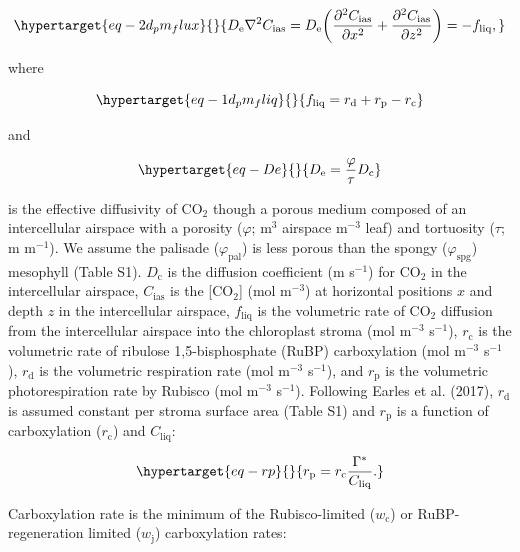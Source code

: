 \documentclass[
  letterpaper,
  DIV=11,
  numbers=noendperiod]{scrartcl}
\begin{document}
\begin{equation}\protect\hypertarget{eq-2d_pm_flux}{}{D_\text{e} \nabla^2 C_\text{ias} = D_\text{e} \bigg(\frac{\partial^2 C_\text{ias}}{\partial x^2} + \frac{\partial^2 C_\text{ias}}{\partial z^2}\bigg) = -f_\text{liq},}\label{eq-2d_pm_flux}\end{equation}

where

\begin{equation}\protect\hypertarget{eq-1d_pm_fliq}{}{f_\text{liq} = r_\text{d} + r_\text{p} - r_\text{c}}\label{eq-1d_pm_fliq}\end{equation}

and

\begin{equation}\protect\hypertarget{eq-De}{}{
D_\text{e} = \frac{\varphi}{\tau} D_\text{c}
}\label{eq-De}\end{equation}

is the effective diffusivity of CO\(_2\) though a porous medium composed
of an intercellular airspace with a porosity (\(\varphi\); m\(^3\)
airspace m\(^{-3}\) leaf) and tortuosity (\(\tau\); m m\(^{-1}\)). We
assume the palisade (\(\varphi_\text{pal}\)) is less porous than the
spongy (\(\varphi_\text{spg}\)) mesophyll (Table S1). \(D_\text{c}\) is
the diffusion coefficient (m s\(^{-1}\)) for CO\(_2\) in the
intercellular airspace, \(C_\text{ias}\) is the {[}CO\(_2\){]} (mol
m\(^{-3}\)) at horizontal positions \(x\) and depth \(z\) in the
intercellular airspace, \(f_\text{liq}\) is the volumetric rate of
CO\(_2\) diffusion from the intercellular airspace into the chloroplast
stroma (mol m\(^{-3}\) s\(^{-1}\)), \(r_\text{c}\) is the volumetric
rate of ribulose 1,5-bisphosphate (RuBP) carboxylation (mol m\(^{-3}\)
s\(^{-1}\)), \(r_\text{d}\) is the volumetric respiration rate (mol
m\(^{-3}\) s\(^{-1}\)), and \(r_\text{p}\) is the volumetric
photorespiration rate by Rubisco (mol m\(^{-3}\) s\(^{-1}\)). Following
Earles et al. (2017), \(r_\text{d}\) is assumed constant per stroma
surface area (Table S1) and \(r_\text{p}\) is a function of
carboxylation (\(r_\text{c}\)) and \(C_\text{liq}\):

\begin{equation}\protect\hypertarget{eq-rp}{}{ r_\text{p} = r_\text{c} \frac{\Gamma^*}{C_\text{liq}}. }\label{eq-rp}\end{equation}

Carboxylation rate is the minimum of the Rubisco-limited
(\(w_\text{c}\)) or RuBP-regeneration limited (\(w_\text{j}\))
carboxylation rates:
\end{document}
